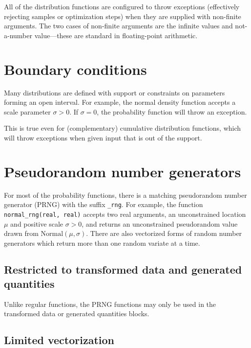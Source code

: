 \documentclass[
  10pt,
]{book}
\begin{document}
All of the distribution functions are configured to throw exceptions
(effectively rejecting samples or optimization steps) when they are
supplied with non-finite arguments. The two cases of non-finite
arguments are the infinite values and not-a-number value---these are
standard in floating-point arithmetic.

\hypertarget{boundary-conditions}{%
\section{Boundary conditions}\label{boundary-conditions}}

Many distributions are defined with support or constraints on
parameters forming an open interval. For example, the normal density
function accepts a scale parameter \(\sigma > 0\). If \(\sigma = 0\), the
probability function will throw an exception.

This is true even for (complementary) cumulative distribution
functions, which will throw exceptions when given input that is out of
the support.

\hypertarget{distributions-prng}{%
\section{Pseudorandom number generators}\label{distributions-prng}}

For most of the probability functions, there is a matching
pseudorandom number generator (PRNG) with the suffix \texttt{\_rng}. For
example, the function \texttt{normal\_rng(real,\ real)} accepts two real
arguments, an unconstrained location \(\mu\) and positive scale \(\sigma > 0\), and returns an unconstrained pseudorandom value drawn from
\(\text{Normal}(\mu,\sigma)\). There are also vectorized forms of
random number generators which return more than one random variate at
a time.

\hypertarget{restricted-to-transformed-data-and-generated-quantities}{%
\subsection{Restricted to transformed data and generated quantities}\label{restricted-to-transformed-data-and-generated-quantities}}

Unlike regular functions, the PRNG functions may only be used in the
transformed data or generated quantities blocks.

\hypertarget{limited-vectorization}{%
\subsection{Limited vectorization}\label{limited-vectorization}}
\end{document}
